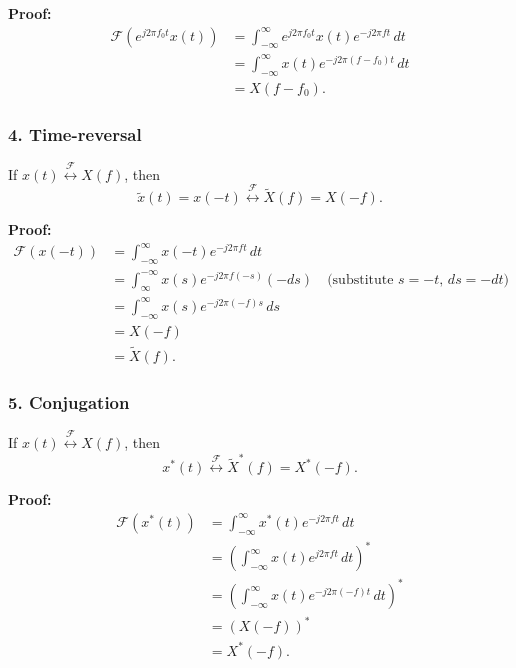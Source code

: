 \begin{derivation}
    \textbf{Proof:}
    \begin{align*}
    \mathcal{F} \left( e^{j 2 \pi f_0 t} x(t) \right) &= \int_{-\infty}^{\infty} e^{j 2 \pi f_0 t} x(t) e^{-j 2 \pi f t} \, dt \\
    &= \int_{-\infty}^{\infty} x(t) e^{-j 2 \pi (f - f_0) t} \, dt \\
    &= X(f - f_0).
    \end{align*}
\end{derivation}

\subsubsection{4. Time-reversal}
\begin{definition}
    If \( x(t) \overset{\mathcal{F}}{\leftrightarrow} X(f) \), then
    \[
    \tilde{x}(t) = x(-t) \overset{\mathcal{F}}{\leftrightarrow} \tilde{X}(f) = X(-f).
    \]
\end{definition}

\begin{derivation}
    \textbf{Proof:}
    \begin{align*}
    \mathcal{F} \left( x(-t) \right) &= \int_{-\infty}^{\infty} x(-t) e^{-j 2 \pi f t} \, dt \\
    &= \int_{\infty}^{-\infty} x(s) e^{-j 2 \pi f (-s)} (-ds) \quad \text{(substitute } s = -t, \, ds = -dt) \\
    &= \int_{-\infty}^{\infty} x(s) e^{-j 2 \pi (-f) s} \, ds \\
    &= X(-f) \\
    &= \tilde{X}(f).
    \end{align*}
\end{derivation}

\subsubsection{5. Conjugation}
\begin{definition}
    If \( x(t) \overset{\mathcal{F}}{\leftrightarrow} X(f) \), then
    \[
    x^*(t) \overset{\mathcal{F}}{\leftrightarrow} \tilde{X}^*(f) = X^*(-f).
    \]
\end{definition}

\begin{derivation}
    \textbf{Proof:}
    \begin{align*}
    \mathcal{F} \left( x^*(t) \right) &= \int_{-\infty}^{\infty} x^*(t) e^{-j 2 \pi f t} \, dt \\
    &= \left( \int_{-\infty}^{\infty} x(t) e^{j 2 \pi f t} \, dt \right)^* \\
    &= \left( \int_{-\infty}^{\infty} x(t) e^{-j 2 \pi (-f) t} \, dt \right)^* \\
    &= \left( X(-f) \right)^* \\
    &= X^*(-f).
    \end{align*}
\end{derivation}

